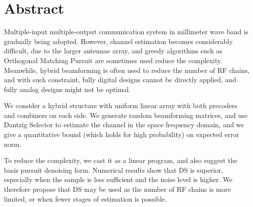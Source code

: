 
\chapter* {Abstract}

Multiple-input multiple-output communication system in millimeter wave band is gradually being adopted.
However, channel estimation becomes considerably difficult, due to the larger antennae array, and greedy algorithms such as Orthogonal Matching Pursuit are sometimes used reduce the complexity.
Meanwhile, hybrid beamforming is often used to reduce the number of RF chains, and with such constraint, fully digital designs cannot be directly applied, and fully analog designs might not be optimal.

We consider a hybrid structure with uniform linear array with both precoders and combiners on each side.
We generate random beamforming matrices, and use Dantzig Selector to estimate the channel in the space frequency domain, and we give a quantitative bound (which holds for high probability) on expected error norm.

To reduce the complexity, we cast it as a linear program, and also suggest the basis pursuit denoising form.
Numerical results show that DS is superior, especially when the sample is less sufficient and the noise level is higher.
We therefore propose that DS may be used as the number of RF chains is more limited, or when fewer stages of estimation is possible.


